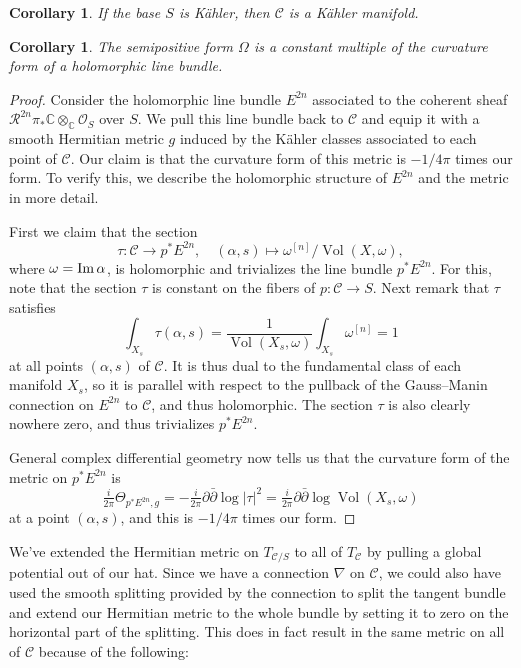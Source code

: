 \documentclass[11pt,a4paper]{amsart}
\newtheorem{coro}[theo]{Corollary}
\theoremstyle{definition}
\theoremstyle{remark}
\newcommand{\CC}{\mathbb{C}}
\newcommand{\Vol}{\mathop{\mathrm{Vol}}}
\def\Im{\mathop{\rm Im}}
\def\dbar{\bar\partial}
\def\cR{\mathcal{R}}
\def\cO{\mathcal{O}}
\def\conn{\nabla}
\def\curv{\tfrac{i}{2\pi}\Theta}
\def\kf{\omega}
\def\ckf{\alpha}
\def\kcForm{\Omega}
\def\^#1{^{[#1]}}
\def\KC{C}
\def\RKC{\mathcal{\KC}}
\begin{document}
\begin{coro}
\label{coro:kahlermanifold}
If the base $S$ is K\"{a}hler, then $\RKC$ is a K\"{a}hler manifold.
\end{coro}


\begin{coro}
The semipositive form $\kcForm$ is a constant multiple of the curvature
form of a holomorphic line bundle.
\end{coro}

\begin{proof}
Consider the holomorphic line bundle $E^{2n}$ associated to the
coherent sheaf $\cR^{2n} \pi_* \CC \otimes_\CC \cO_S$ over $S$.
We pull this line bundle back to $\RKC$ and equip it with a smooth
Hermitian metric $g$ induced by the K\"{a}hler classes associated to each
point of $\RKC$. Our claim is that the curvature form of this
metric is $-1/4\pi$ times our form. To verify this, we describe the
holomorphic structure of $E^{2n}$ and the metric in more detail.

First we claim that the section
$$
\tau: \RKC \to p^*E^{2n},
\quad
(\ckf,s) \mapsto \kf\^n / \Vol(X,\kf),
$$
where $\kf = \Im \ckf$, is holomorphic and trivializes the line
bundle $p^*E^{2n}$. For this, note that the section $\tau$ is constant
on the fibers of $p : \RKC \to S$.  Next remark that $\tau$ satisfies
\begin{equation*}
\int_{X_s} \tau(\ckf,s) 
= \frac{1}{\Vol(X_s,\kf)} \int_{X_s} \kf\^n
= 1
\end{equation*}
at all points $(\ckf,s)$ of $\RKC$. It is thus dual to the
fundamental class of each manifold $X_s$, so it is parallel with
respect to the pullback of the Gauss--Manin connection on $E^{2n}$ to
$\RKC$, and thus holomorphic. The section $\tau$ is also clearly
nowhere zero, and thus trivializes $p^*E^{2n}$.

General complex differential geometry now tells us that the curvature
form of the metric on $p^*E^{2n}$ is
\begin{equation*}
\curv_{p^*E^{2n}, g}
= -\tfrac{i}{2\pi}\partial \dbar \log |\tau|^2 
= \tfrac{i}{2\pi}\partial \dbar \log \Vol(X_s,\kf)
\end{equation*}
at a point $(\ckf,s)$, and this is $-1/4\pi$ times our form.
\end{proof}



We've extended the Hermitian metric on $T_{\RKC/S}$ to all of
$T_{\RKC}$ by pulling a global potential out of our hat. Since we
have a connection $\conn$ on $\RKC$, we could also have used the
smooth splitting provided by the connection to split the tangent bundle
and extend our Hermitian metric to the whole bundle by setting it to
zero on the horizontal part of the splitting. This does in fact result
in the same metric on all of $\RKC$ because of the following:
\end{document}

